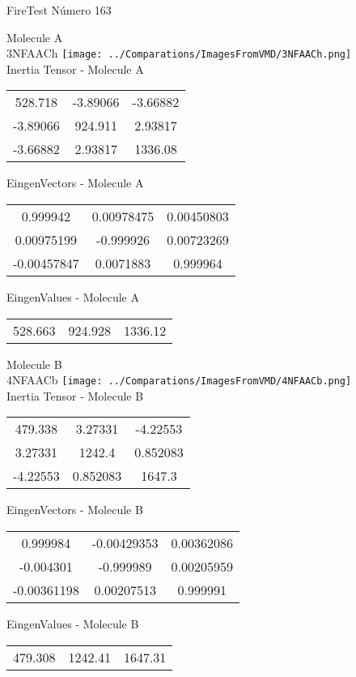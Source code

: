 \vtab[-2cm]
\begin{center}
{\large FireTest \tab Número 163}
\end{center}
\begin{multicols}{2}
\begin{center}

Molecule A \\ 
3NFAACh
\texttt{[image: ../Comparations/ImagesFromVMD/3NFAACh.png]}
\\
Inertia Tensor - Molecule A \\
\vtab

\begin{tabular}{|c c c|}
528.718	 & 	-3.89066	 & 	-3.66882	 \\
-3.89066	 & 	924.911	 & 	2.93817	 \\
-3.66882	 & 	2.93817	 & 	1336.08
\end{tabular}

\vtab
 EingenVectors - Molecule A     \\
\vtab
\begin{tabular}{|c c c|}
0.999942	 & 	0.00978475	 & 	0.00450803	 \\
0.00975199	 & 	-0.999926	 & 	0.00723269	 \\
-0.00457847	 & 	0.0071883	 & 	0.999964
\end{tabular}

\vtab
 EingenValues - Molecule A     \\
\vtab
\begin{tabular}{|c c c|}
528.663	 & 	924.928	 & 	1336.12	 \\
\end{tabular}
\columnbreak

Molecule B \\ 
4NFAACb
\texttt{[image: ../Comparations/ImagesFromVMD/4NFAACb.png]}
\\
Inertia Tensor - Molecule B \\
\vtab

\begin{tabular}{|c c c|}
479.338	 & 	3.27331	 & 	-4.22553	 \\
3.27331	 & 	1242.4	 & 	0.852083	 \\
-4.22553	 & 	0.852083	 & 	1647.3
\end{tabular}

\vtab
 EingenVectors - Molecule B     \\
\vtab
\begin{tabular}{|c c c|}
0.999984	 & 	-0.00429353	 & 	0.00362086	 \\
-0.004301	 & 	-0.999989	 & 	0.00205959	 \\
-0.00361198	 & 	0.00207513	 & 	0.999991
\end{tabular}

\vtab
 EingenValues - Molecule B     \\
\vtab
\begin{tabular}{|c c c|}
479.308	 & 	1242.41	 & 	1647.31	 \\
\end{tabular}

\end{center}
\end{multicols}
